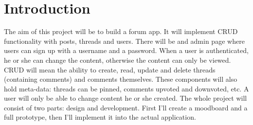 \section{Introduction}
The aim of this project will be to build a forum app. It will implement CRUD
functionality with posts, threads and users. There will be and admin page where
users can sign up with a username and a password. When a user is authenticated,
he or she can change the content, otherwise the content can only be viewed.
CRUD will mean the ability to create, read, update and delete threads
(containing comments) and comments themselves. These components will also hold meta-data:
threads can be pinned, comments upvoted and downvoted, etc.
A user will only be able to change content
he or she created. The whole project will consist of two parts: design and
development. First I'll create a moodboard and a full prototype, then I'll
implement it into the actual application.
